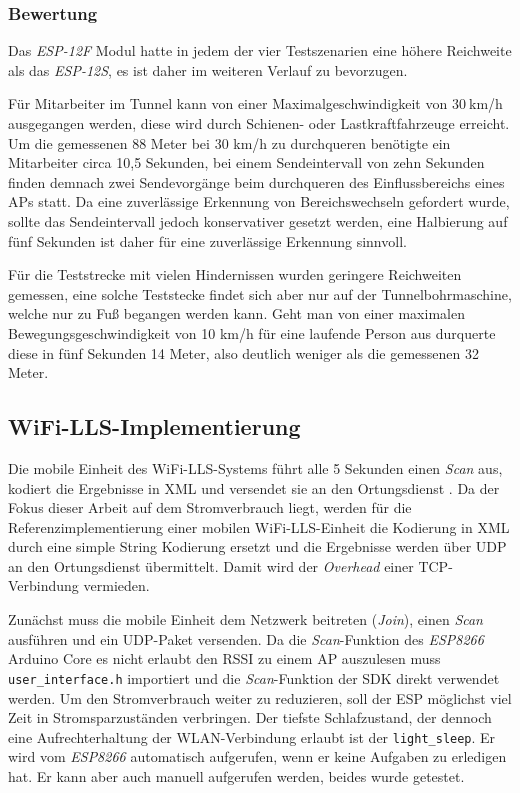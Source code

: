 \subsubsection{Bewertung}
\label{ch:Reichweite:sec:bewertung}
Das \emph{ESP-12F} Modul hatte in jedem der vier Testszenarien eine höhere Reichweite als das \emph{ESP-12S}, es ist daher im weiteren Verlauf zu bevorzugen.

Für Mitarbeiter im Tunnel kann von einer Maximalgeschwindigkeit von $30\ $km/h ausgegangen werden, diese wird durch Schienen- oder Lastkraftfahrzeuge erreicht. 
Um die gemessenen 88 Meter bei 30 km/h zu durchqueren benötigte ein Mitarbeiter circa 10,5 Sekunden, bei einem Sendeintervall von zehn Sekunden finden demnach zwei Sendevorgänge beim durchqueren des Einflussbereichs eines APs statt.
Da eine zuverlässige Erkennung von Bereichswechseln gefordert wurde, sollte das Sendeintervall jedoch konservativer gesetzt werden, eine Halbierung auf fünf Sekunden ist daher für eine zuverlässige Erkennung sinnvoll.

Für die Teststrecke mit vielen Hindernissen wurden geringere Reichweiten gemessen, eine solche Teststecke findet sich aber nur auf der Tunnelbohrmaschine, welche nur zu Fuß begangen werden kann. 
Geht man von einer maximalen Bewegungsgeschwindigkeit von 10 km/h für eine laufende Person aus durquerte diese in fünf Sekunden 14 Meter, also deutlich weniger als die gemessenen 32 Meter.





\subsection{WiFi-LLS-Implementierung}
\label{ch:phase1:sec:wifills}
Die mobile Einheit des WiFi-LLS-Systems führt alle 5 Sekunden einen \emph{Scan} aus, kodiert die Ergebnisse in XML und versendet sie an den Ortungsdienst \cite{chen2007design}.
Da der Fokus dieser Arbeit auf dem Stromverbrauch liegt, werden für die Referenzimplementierung einer mobilen WiFi-LLS-Einheit die Kodierung in XML durch eine simple String Kodierung ersetzt und die Ergebnisse werden über UDP an den Ortungsdienst übermittelt. 
Damit wird der \emph{Overhead} einer TCP-Verbindung vermieden.

Zunächst muss die mobile Einheit dem Netzwerk beitreten (\emph{Join}), einen \emph{Scan} ausführen und ein UDP-Paket versenden.
Da die \emph{Scan}-Funktion des \emph{ESP8266} Arduino Core es nicht erlaubt den RSSI zu einem AP auszulesen muss \texttt{user\_interface.h} importiert und die \emph{Scan}-Funktion der SDK direkt verwendet werden.
Um den Stromverbrauch weiter zu reduzieren, soll der ESP möglichst viel Zeit in Stromsparzuständen verbringen.
Der tiefste Schlafzustand, der dennoch eine Aufrechterhaltung der WLAN-Verbindung erlaubt ist der \texttt{light\_sleep}. 
Er wird vom \emph{ESP8266} automatisch aufgerufen, wenn er keine Aufgaben zu erledigen hat.
Er kann aber auch manuell aufgerufen werden, beides wurde getestet.

